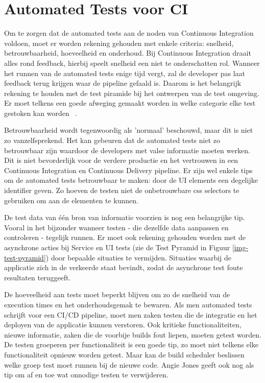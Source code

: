 \section{Automated Tests voor CI}
\label{sec:automated-test-voor-ci}
Om te zorgen dat de automated tests aan de noden van Continuous Integration voldoen, moet er worden rekening gehouden met enkele criteria: snelheid, betrouwbaarheid, hoeveelheid en onderhoud.
Bij Continuous Integration draait alles rond feedback, hierbij speelt snelheid een niet te onderschatten rol. Wanneer het runnen van de automated tests enige tijd vergt, zal de developer pas laat feedback terug krijgen waar de pipeline gefaald is. Daarom is het belangrijk rekening te houden met de test piramide bij het ontwerpen van de test omgeving. Er moet telkens een goede afweging gemaakt worden in welke categorie elke test gestoken kan worden ~\autocite{Jones2019}.

Betrouwbaarheid wordt tegenwoordig als 'normaal' beschouwd, maar dit is niet zo vanzelfsprekend. Het kan gebeuren dat de automated tests niet zo betrouwbaar zijn waardoor de developers met valse informatie moeten werken. Dit is niet bevorderlijk voor de verdere productie en het vertrouwen in een Continuous Integration en Continuous Delivery pipeline. Er zijn wel enkele tips om de automated tests betrouwbaar te maken: door de UI elements een degelijke identifier geven. Zo hoeven de testen niet de onbetrouwbare css selectors te gebruiken om aan de elementen te kunnen. 

De test data van één bron van informatie voorzien is nog een belangrijke tip. Vooral in het bijzonder wanneer testen - die dezelfde data aanpassen en controleren - tegelijk runnen. Er moet ook rekening gehouden worden met de asynchrone acties bij Service en UI tests (zie de Test Pyramid in Figuur \ref{img-test-pyramid}) door bepaalde situaties te vermijden. Situaties waarbij de applicatie zich in de verkeerde staat bevindt, zodat de asynchrone test foute resultaten teruggeeft.

De hoeveelheid aan tests moet beperkt blijven om zo de snelheid van de execution times en het onderhoudsgemak te bewaren.
Als men automated tests schrijft voor een CI/CD pipeline, moet men zaken testen die de integratie en het deployen van de applicatie kunnen verstoren.
Ook kritieke functionaliteiten, nieuwe informatie, zaken die de voorbije builds fout liepen, moeten getest worden. 
De testen groeperen per functionaliteit is een goede tip, zo moet niet telkens elke functionaliteit opnieuw worden getest. Maar kan de build scheduler beslissen welke groep test moet runnen bij de nieuwe code. 
Angie Jones \textcite{Jones2019} geeft ook nog als tip om af en toe wat onnodige testen te verwijderen.

